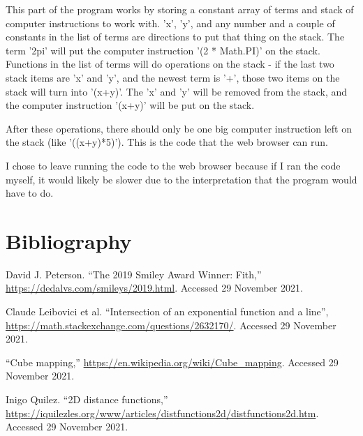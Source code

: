 This part of the program works by storing a constant array of terms and stack of computer instructions to work with.  'x', 'y', and any number and a couple of constants in the list of terms are directions to put that thing on the stack.  The term '2pi' will put the computer instruction '(2 * Math.PI)' on the stack.  Functions in the list of terms will do operations on the stack - if the last two stack items are 'x' and 'y', and the newest term is '+', those two items on the stack will turn into '(x+y)'.  The 'x' and 'y' will be removed from the stack, and the computer instruction '(x+y)' will be put on the stack.

After these operations, there should only be one big computer instruction left on the stack (like '((x+y)*5)').  This is the code that the web browser can run.

I chose to leave running the code to the web browser because if I ran the code myself, it would likely be slower due to the interpretation that the program would have to do.

\section*{Bibliography}

David J. Peterson.  ``The 2019 Smiley Award Winner: Fith,'' \url{https://dedalvs.com/smileys/2019.html}.  Accessed 29 November 2021.

Claude Leibovici et al.  ``Intersection of an exponential function and a line'', \url{https://math.stackexchange.com/questions/2632170/}.  Accessed 29 November 2021.

``Cube mapping,'' \url{https://en.wikipedia.org/wiki/Cube_mapping}.  Accessed 29 November 2021.

Inigo Quilez.  ``2D distance functions,'' \url{https://iquilezles.org/www/articles/distfunctions2d/distfunctions2d.htm}.  Accessed 29 November 2021.


